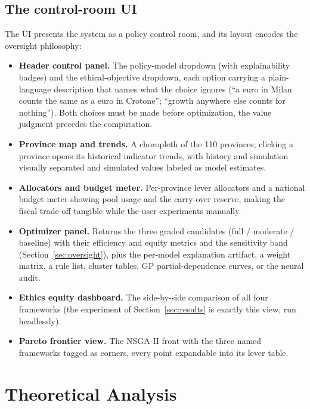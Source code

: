 \documentclass[11pt,a4paper]{article}
\begin{document}
\subsection{The control-room UI}
\label{sec:ui}

The UI presents the system as a policy control room, and its layout encodes
the oversight philosophy:

\begin{itemize}
    \item \textbf{Header control panel.} The policy-model dropdown (with
    explainability badges) and the ethical-objective dropdown, each option
    carrying a plain-language description that names what the choice ignores
    (``a euro in Milan counts the same as a euro in Crotone''; ``growth
    anywhere else counts for nothing''). Both choices must be made before
    optimization, the value judgment precedes the computation.
    \item \textbf{Province map and trends.} A choropleth of the 110 provinces;
    clicking a province opens its historical indicator trends, with history and
    simulation visually separated and simulated values labeled as model
    estimates.
    \item \textbf{Allocators and budget meter.} Per-province lever allocators
    and a national budget meter showing pool usage and the carry-over reserve,
    making the fiscal trade-off tangible while the user experiments manually.
    \item \textbf{Optimizer panel.} Returns the three graded candidates (full /
    moderate / baseline) with their efficiency and equity metrics and the
    sensitivity band (Section~\ref{sec:oversight}), plus the per-model
    explanation artifact, a weight matrix, a rule list, cluster tables, GP
    partial-dependence curves, or the neural audit.
    \item \textbf{Ethics equity dashboard.} The side-by-side comparison of all
    four frameworks (the experiment of Section~\ref{sec:results} is exactly
    this view, run headlessly).
    \item \textbf{Pareto frontier view.} The NSGA-II front with the three
    named frameworks tagged as corners, every point expandable into its lever
    table.
\end{itemize}

\section{Theoretical Analysis}
\label{sec:theory}
\end{document}
